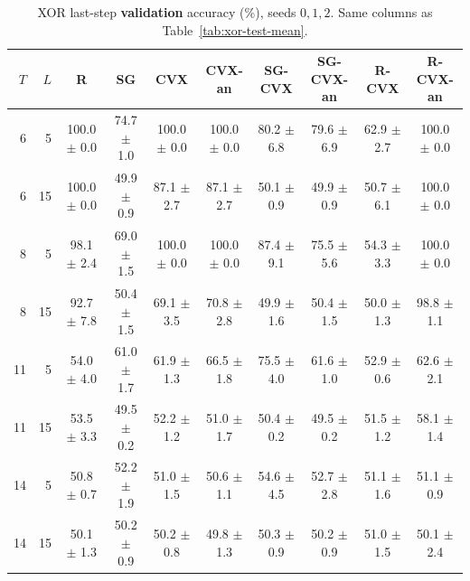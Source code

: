 \documentclass[11pt]{article}
\begin{document}
\begin{table}[t]
\centering
\caption{XOR last-step \textbf{validation} accuracy (\%), seeds $0,1,2$. Same columns as Table~\ref{tab:xor-test-mean}.}
\label{tab:xor-val-mean}
\small
\begin{tabular}{rrcccccccc}
\toprule
$T$ & $L$ & R & SG & CVX & CVX-an & SG-CVX & SG-CVX-an & R-CVX & R-CVX-an \\
\midrule
6 & 5 & 100.0 $\pm$ 0.0 & 74.7 $\pm$ 1.0 & 100.0 $\pm$ 0.0 & 100.0 $\pm$ 0.0 & 80.2 $\pm$ 6.8 & 79.6 $\pm$ 6.9 & 62.9 $\pm$ 2.7 & 100.0 $\pm$ 0.0 \\
6 & 15 & 100.0 $\pm$ 0.0 & 49.9 $\pm$ 0.9 & 87.1 $\pm$ 2.7 & 87.1 $\pm$ 2.7 & 50.1 $\pm$ 0.9 & 49.9 $\pm$ 0.9 & 50.7 $\pm$ 6.1 & 100.0 $\pm$ 0.0 \\
8 & 5 & 98.1 $\pm$ 2.4 & 69.0 $\pm$ 1.5 & 100.0 $\pm$ 0.0 & 100.0 $\pm$ 0.0 & 87.4 $\pm$ 9.1 & 75.5 $\pm$ 5.6 & 54.3 $\pm$ 3.3 & 100.0 $\pm$ 0.0 \\
8 & 15 & 92.7 $\pm$ 7.8 & 50.4 $\pm$ 1.5 & 69.1 $\pm$ 3.5 & 70.8 $\pm$ 2.8 & 49.9 $\pm$ 1.6 & 50.4 $\pm$ 1.5 & 50.0 $\pm$ 1.3 & 98.8 $\pm$ 1.1 \\
11 & 5 & 54.0 $\pm$ 4.0 & 61.0 $\pm$ 1.7 & 61.9 $\pm$ 1.3 & 66.5 $\pm$ 1.8 & 75.5 $\pm$ 4.0 & 61.6 $\pm$ 1.0 & 52.9 $\pm$ 0.6 & 62.6 $\pm$ 2.1 \\
11 & 15 & 53.5 $\pm$ 3.3 & 49.5 $\pm$ 0.2 & 52.2 $\pm$ 1.2 & 51.0 $\pm$ 1.7 & 50.4 $\pm$ 0.2 & 49.5 $\pm$ 0.2 & 51.5 $\pm$ 1.2 & 58.1 $\pm$ 1.4 \\
14 & 5 & 50.8 $\pm$ 0.7 & 52.2 $\pm$ 1.9 & 51.0 $\pm$ 1.5 & 50.6 $\pm$ 1.1 & 54.6 $\pm$ 4.5 & 52.7 $\pm$ 2.8 & 51.1 $\pm$ 1.6 & 51.1 $\pm$ 0.9 \\
14 & 15 & 50.1 $\pm$ 1.3 & 50.2 $\pm$ 0.9 & 50.2 $\pm$ 0.8 & 49.8 $\pm$ 1.3 & 50.3 $\pm$ 0.9 & 50.2 $\pm$ 0.9 & 51.0 $\pm$ 1.5 & 50.1 $\pm$ 2.4 \\
\bottomrule
\end{tabular}
\end{table}
\end{document}
